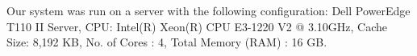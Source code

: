 Our system was run on a server with the following configuration: Dell
PowerEdge T110 II Server, CPU: Intel(R) Xeon(R) CPU E3-1220 V2 @
3.10GHz, Cache Size: 8,192 KB, No. of Cores : 4, Total Memory (RAM) : 16 GB.
